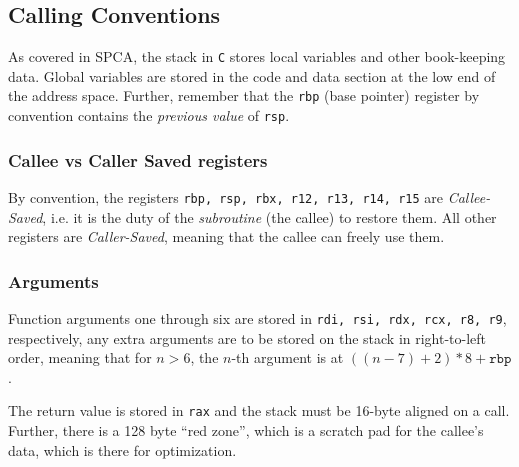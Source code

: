 \subsection{Calling Conventions}
As covered in SPCA, the stack in \texttt{C} stores local variables and other book-keeping data.
Global variables are stored in the code and data section at the low end of the address space.
Further, remember that the \texttt{rbp} (base pointer) register by convention contains the \textit{previous value} of \texttt{rsp}.

\subsubsection{Callee vs Caller Saved registers}
By convention, the registers \texttt{rbp, rsp, rbx, r12, r13, r14, r15} are \textit{Callee-Saved}, i.e. it is the duty of the \textit{subroutine} (the callee) to restore them.
All other registers are \textit{Caller-Saved}, meaning that the callee can freely use them.

\subsubsection{Arguments}
Function arguments one through six are stored in \texttt{rdi, rsi, rdx, rcx, r8, r9}, respectively, any extra arguments are to be stored on the stack in right-to-left order,
meaning that for $n > 6$, the $n$-th argument is at $((n - 7) + 2) * 8 + \texttt{rbp}$.

The return value is stored in \texttt{rax} and the stack must be 16-byte aligned on a call.
Further, there is a 128 byte ``red zone'', which is a scratch pad for the callee's data, which is there for optimization.
